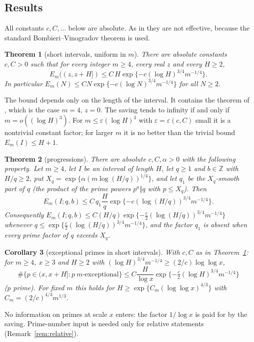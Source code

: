 \documentclass[10pt,reqno]{amsart}
\newtheorem{introthm}{Theorem}
\newtheorem{introcor}[introthm]{Corollary}
\theoremstyle{definition}
\newcommand{\Z}{\mathbb Z}
\begin{document}
\subsection*{Results}
All constants $c,C,\ldots$ below are absolute.  As in \cite{TQ} they
are not effective, because the standard Bombieri--Vinogradov theorem is
used.

\begin{introthm}[short intervals, uniform in $m$]\label{thm:A}
There are absolute constants $c,C>0$ such that for every integer $m\geq4$,
every real $z$ and every $H\geq2$,
\[
 E_m((z,z+H])\leq C\,H\exp\{-c(\log H)^{3/4}m^{-1/4}\}.
\]
In particular $E_m(N)\leq C N\exp\{-c(\log N)^{3/4}m^{-1/4}\}$ for all
$N\geq2$.
\end{introthm}

The bound depends only on the length of the interval.  It contains the
theorem of \cite{TQ}, which is the case $m=4$, $z=0$.  The saving tends
to infinity if and only if $m=o((\log H)^3)$.  For
$m\leq\varepsilon(\log H)^3$ with $\varepsilon=\varepsilon(c,C)$ small it is
a nontrivial constant factor; for larger $m$ it is no better than the
trivial bound $E_m(I)\leq H+1$.

\begin{introthm}[progressions]\label{thm:B}
There are absolute $c,C,\alpha>0$ with the following property.  Let
$m\geq4$, let $I$ be an interval of length $H$, let $q\geq1$ and $b\in\Z$
with $H/q\geq2$, put
$X_q=\exp\{\alpha(m\log(H/q))^{1/4}\}$, and let $q_1$ be the
$X_q$-smooth part of $q$ (the product of the prime powers $p^a\Vert q$
with $p\leq X_q$).  Then
\[
 E_m(I;q,b)\leq C\,q_1\frac Hq
     \exp\{-c(\log(H/q))^{3/4}m^{-1/4}\}.
\]
Consequently $E_m(I;q,b)\leq C(H/q)\exp\{-\tfrac c2(\log(H/q))^{3/4}m^{-1/4}\}$
whenever $q\leq\exp\{\tfrac c2(\log(H/q))^{3/4}m^{-1/4}\}$, and the
factor $q_1$ is absent when every prime factor of $q$ exceeds $X_q$.
\end{introthm}

\begin{introcor}[exceptional primes in short intervals]\label{cor:C}
With $c,C$ as in Theorem~\ref{thm:A}: for $m\geq4$, $x\geq3$ and $H\geq2$
with $(\log H)^{3/4}m^{-1/4}\geq(2/c)\log\log x$,
\[
 \#\{p\in(x,x+H]:p\ m\text{-exceptional}\}
 \leq C\frac H{\log x}\exp\{-\tfrac c2(\log H)^{3/4}m^{-1/4}\}
\]
($p$ prime).  For fixed $m$ this holds for $H\geq\exp\{C_m(\log\log x)^{4/3}\}$ with
$C_m=(2/c)^{4/3}m^{1/3}$.
\end{introcor}

No information on primes at scale $x$ enters: the factor $1/\log x$ is
paid for by the saving.  Prime-number input is needed only for relative
statements (Remark~\ref{rem:relative}).
\end{document}
